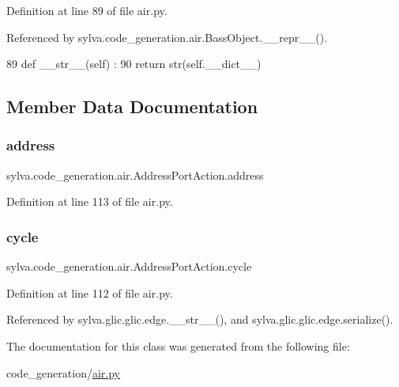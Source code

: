 Definition at line 89 of file air.\+py.



Referenced by sylva.\+code\+\_\+generation.\+air.\+Bass\+Object.\+\_\+\+\_\+repr\+\_\+\+\_\+().


\begin{DoxyCode}
89   \textcolor{keyword}{def }\_\_str\_\_(self) :
90     \textcolor{keywordflow}{return} str(self.\_\_dict\_\_)
\end{DoxyCode}


\subsection{Member Data Documentation}
\mbox{\label{classsylva_1_1code__generation_1_1air_1_1_address_port_action_a6a2ed473ad0902a5fb0128e61b42c988}} 
\subsubsection{\texorpdfstring{address}{address}}
{\footnotesize\ttfamily sylva.\+code\+\_\+generation.\+air.\+Address\+Port\+Action.\+address}



Definition at line 113 of file air.\+py.

\mbox{\label{classsylva_1_1code__generation_1_1air_1_1_address_port_action_aa6bd7cd1cbf6cf3a36e02329a88affbf}} 
\subsubsection{\texorpdfstring{cycle}{cycle}}
{\footnotesize\ttfamily sylva.\+code\+\_\+generation.\+air.\+Address\+Port\+Action.\+cycle}



Definition at line 112 of file air.\+py.



Referenced by sylva.\+glic.\+glic.\+edge.\+\_\+\+\_\+str\+\_\+\+\_\+(), and sylva.\+glic.\+glic.\+edge.\+serialize().



The documentation for this class was generated from the following file\+:\begin{DoxyCompactItemize}
\item 
code\+\_\+generation/\hyperlink{air_8py}{air.\+py}\end{DoxyCompactItemize}
